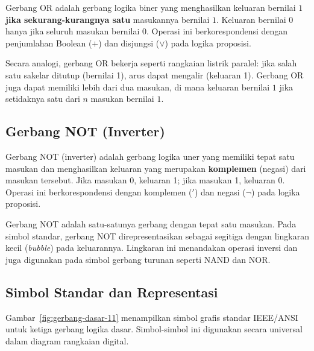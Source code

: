 \begin{definisi}[Gerbang OR]
Gerbang OR adalah gerbang logika biner yang menghasilkan keluaran bernilai $1$ \textbf{jika sekurang-kurangnya satu} masukannya bernilai $1$. Keluaran bernilai $0$ hanya jika seluruh masukan bernilai $0$. Operasi ini berkorespondensi dengan penjumlahan Boolean ($+$) dan disjungsi ($\vee$) pada logika proposisi.
\end{definisi}

Secara analogi, gerbang OR bekerja seperti rangkaian listrik paralel: jika salah satu sakelar ditutup (bernilai 1), arus dapat mengalir (keluaran 1). Gerbang OR juga dapat memiliki lebih dari dua masukan, di mana keluaran bernilai $1$ jika setidaknya satu dari $n$ masukan bernilai $1$.

\subsection{Gerbang NOT (Inverter)}

\begin{definisi}
Gerbang NOT (inverter) adalah gerbang logika uner yang memiliki tepat satu masukan dan menghasilkan keluaran yang merupakan \textbf{komplemen} (negasi) dari masukan tersebut. Jika masukan 0, keluaran 1; jika masukan 1, keluaran 0. Operasi ini berkorespondensi dengan komplemen ($'$) dan negasi ($\neg$) pada logika proposisi.
\end{definisi}

Gerbang NOT adalah satu-satunya gerbang dengan tepat satu masukan. Pada simbol standar, gerbang NOT direpresentasikan sebagai segitiga dengan lingkaran kecil (\textit{bubble}) pada keluarannya. Lingkaran ini menandakan operasi inversi dan juga digunakan pada simbol gerbang turunan seperti NAND dan NOR.

\subsection{Simbol Standar dan Representasi}

Gambar~\ref{fig:gerbang-dasar-11} menampilkan simbol grafis standar IEEE/ANSI untuk ketiga gerbang logika dasar. Simbol-simbol ini digunakan secara universal dalam diagram rangkaian digital.

